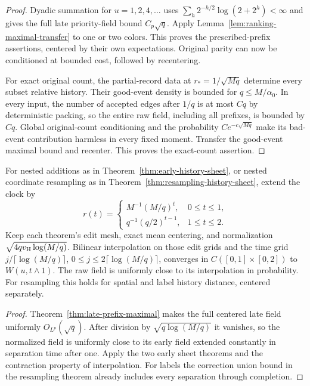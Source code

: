 \documentclass[11pt,letterpaper]{article}
\begin{document}
\begin{proof}
Dyadic summation for $u=1,2,4,\ldots$ uses
$\sum_h2^{-h/2}\log(2+2^h)<\infty$ and gives the full
late priority-field bound $C_p\sqrt q$.
Apply Lemma~\ref{lem:ranking-maximal-transfer} to one or
two colors. This proves the prescribed-prefix assertions,
centered by their own expectations.
Original parity can now be conditioned at bounded cost,
followed by recentering.

For exact original count, the partial-record data at
$r_*=1/\sqrt{Mq}$ determine every subset relative history.
Their good-event density is bounded for
$q\le M/\alpha_0$. In every input, the number of accepted
edges after $1/q$ is at most $Cq$ by deterministic packing,
so the entire raw field, including all prefixes, is bounded
by $Cq$. Global original-count conditioning and the
probability $Ce^{-c\sqrt{Mq}}$ make its bad-event
contribution harmless in every fixed moment.
Transfer the good-event maximal bound and recenter.
This proves the exact-count assertion.
\end{proof}

\begin{corollary}
\label{cor:complete-history-sheet}
For nested additions as in Theorem~\ref{thm:early-history-sheet},
or nested coordinate resampling as in
Theorem~\ref{thm:resampling-history-sheet}, extend the clock by
\[
 r(t)=
 \begin{cases}
 M^{-1}(M/q)^t,&0\le t\le1,\\
 q^{-1}(q/2)^{t-1},&1\le t\le2.
 \end{cases}
\]
Keep each theorem's edit mesh, exact mean centering, and
normalization $\sqrt{4qv_{\rm H}\log(M/q)}$.
Bilinear interpolation on those edit grids and the time
grid $j/\lceil\log(M/q)\rceil$, $0\le j\le2\lceil\log(M/q)\rceil$,
converges in $C([0,1]\times[0,2])$ to
$W(u,t\wedge1)$.
The raw field is uniformly close to its interpolation in
probability. For resampling this holds for spatial and
label history distance, centered separately.
\end{corollary}
\begin{proof}
Theorem~\ref{thm:late-prefix-maximal} makes the full centered
late field uniformly $O_{L^p}(\sqrt q)$.
After division by $\sqrt{q\log(M/q)}$ it vanishes, so
the normalized field is uniformly close to its early field
extended constantly in separation time after one.
Apply the two early sheet theorems and the contraction
property of interpolation.
For labels the correction union bound in the resampling
theorem already includes every separation through completion.
\end{proof}
\end{document}
